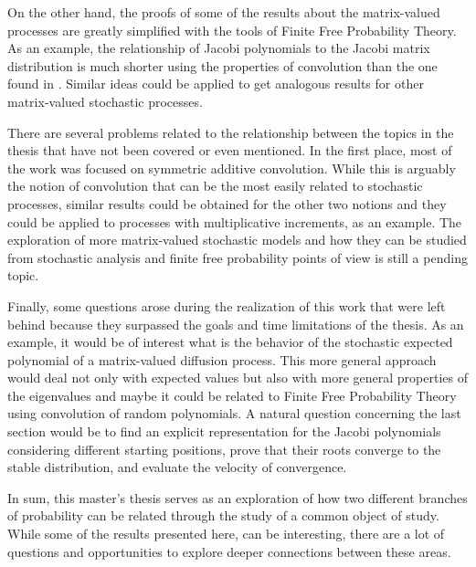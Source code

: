 On the other hand, the proofs of some of the results about the matrix-valued processes are greatly simplified with the tools of Finite Free Probability Theory. As an example, the relationship of Jacobi polynomials to the Jacobi matrix distribution is much shorter using the properties of convolution than the one found in \cite{article:aomoto1987jacobi_selberg_integrals}. Similar ideas could be applied to get analogous results for other matrix-valued stochastic processes. 

There are several problems related to the relationship between the topics in the thesis that have not been covered or even mentioned. In the first place, most of the work was focused on symmetric additive convolution. While this is arguably the notion of convolution that can be the most easily related to stochastic processes, similar results could be obtained for the other two notions and they could be applied to processes with multiplicative increments, as an example. The exploration of more matrix-valued stochastic models and how they can be studied from stochastic analysis and finite free probability points of view is still a pending topic. 

Finally, some questions arose during the realization of this work that were left behind because they surpassed the goals and time limitations of the thesis. As an example, it would be of interest what is the behavior of the stochastic expected polynomial of a matrix-valued diffusion process. This more general approach would deal not only with expected values but also with more general properties of the eigenvalues and maybe it could be related to Finite Free Probability Theory using convolution of random polynomials.  A natural question concerning the last section would be to find an explicit representation for the Jacobi polynomials considering different starting positions, prove that their roots converge to the stable distribution, and evaluate the velocity of convergence.

In sum, this master's thesis serves as an exploration of how two different branches of probability can be related through the study of a common object of study. While some of the results presented here, can be interesting, there are a lot of questions and opportunities to explore deeper connections between these areas.
